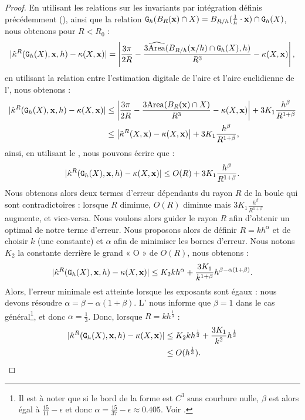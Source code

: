 \begin{proof}
  En utilisant les relations sur les invariants par intégration définis
  précédemment (), ainsi que la relation
  $\DigF{\Ball{R}{\vx} \cap \Shape}{h}=\Ball{R/h}{\frac{1}{h} \cdot \vx} \cap
  \DSh$, nous obtenons pour $R < R_0$ :
  \begin{equation}
    | \CurvH{R}(\DSh,\vx,h) - \Curv(\Shape,\vx) |
    = \left|\frac{3\pi}{2R}-\frac{3\AreaC(\Ball{R/h}{\vx / h} \cap \DSh, h)}{R^3} - \Curv(\Shape,\vx) \right|,
  \end{equation}
  en utilisant la relation entre l'estimation digitale de l'aire et l'aire
  euclidienne de l', nous obtenons :
  \begin{align}\label{eq-curvhat-error-bound-prelim}
    | \CurvH{R}(\DSh,\vx,h) - \Curv(\Shape,\vx) |
    &\le \left|\frac{3\pi}{2R}-\frac{3\Area(\Ball{R}{\vx} \cap \Shape)}{R^3} - \Curv(\Shape,\vx) \right| + 3K_1 \frac{h^\beta}{R^{1+\beta}} \nonumber \\
    &\le \left|\CurvT{R}(\Shape,\vx) - \Curv(\Shape,\vx) \right| + 3K_1 \frac{h^\beta}{R^{1+\beta}},
  \end{align}
  ainsi, en utilisant le , nous pouvons
  écrire que :
  \begin{equation}\label{eq-curvhat-error-bound-prelim2}
    | \CurvH{R}(\DSh,\vx,h) - \Curv(\Shape,\vx) |
    \le O(R) + 3K_1 \frac{h^\beta}{R^{1+\beta}}.
  \end{equation}
  Nous obtenons alors deux termes d'erreur dépendants du rayon $R$ de la boule
  qui sont contradictoires : lorsque $R$ diminue, $O(R)$ diminue mais $3K_1
  \frac{h^\beta}{R^{1+\beta}}$ augmente, et vice-versa. Nous voulons alors
  guider le rayon $R$ afin d'obtenir un optimal de notre terme d'erreur. Nous
  proposons alors de définir $R = k h^{\alpha}$ et de choisir $k$ (une
  constante) et $\alpha$ afin de minimiser les bornes d'erreur. Nous notons
  $K_2$ la constante derrière le grand « O » de $O(R)$, nous obtenons :
  \begin{equation}\label{eq-curvhat-error-bound-prelim3}
    | \CurvH{R}(\DSh,\vx,h) - \Curv(\Shape,\vx) |
    \le K_2kh^\alpha + \frac{3K_1}{k^{1+\beta}}h^{\beta - \alpha(1+\beta)}.
  \end{equation}
  Alors, l'erreur minimale est atteinte lorsque les exposants sont égaux : nous
  devons résoudre $\alpha = \beta - \alpha(1+\beta)$.
  L' nous informe que $\beta = 1$ dans le cas
  général\footnote{Il est à noter que si le bord de la forme est $C^3$ sans
  courbure nulle, $\beta$ est alors égal à $\frac{15}{11} - \epsilon$ et donc
  $\alpha = \frac{15}{37} - \epsilon \approx 0.405$. Voir
  .}, et donc $\alpha = \frac{1}{3}$. Donc,
  lorsque $R=kh^{\frac{1}{3}}$ :
  \begin{align}\label{eq-curvhat-error-bound-prelim4}
    | \CurvH{R}(\DSh,\vx,h) - \Curv(\Shape,\vx) |
    &\le K_2kh^\frac{1}{3} + \frac{3K_1}{k^2}h^{\frac{1}{3}}\\
    &\le O(h^\frac{1}{3}).
  \end{align}
\end{proof}

